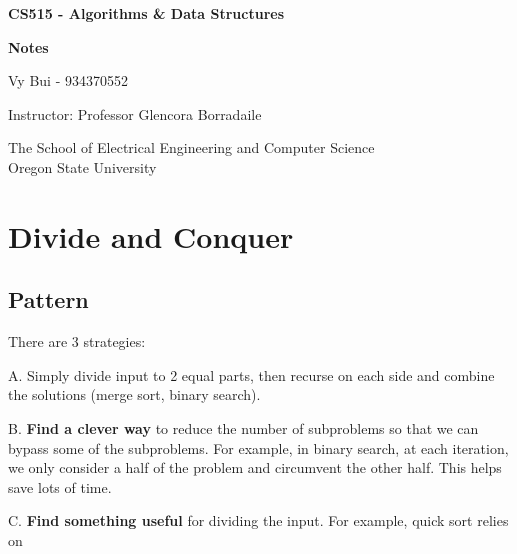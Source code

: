 \documentclass[12pt,article]{article}
\begin{document}
\begin{titlepage}
    \begin{center}
        \vspace*{4cm}

        \textbf{\Large CS515 - Algorithms \& Data Structures}

        \vspace{0.5cm}
 
        \textbf{\Large Notes}
 
        \vspace{1cm}

        Vy Bui - 934370552

        \vspace{2cm}

        Instructor: Professor Glencora Borradaile
        \vfill
             
        \vspace{0.8cm}
      
             
        The School of Electrical Engineering and Computer Science\\
        Oregon State University\\
             
    \end{center}
\end{titlepage}


\section{Divide and Conquer}
\subsection{Pattern}

There are 3 strategies:

A. Simply divide input to 2 equal parts, then recurse on each side and combine the solutions (merge sort, binary search).

B. \textbf{Find a clever way} to reduce the number of subproblems so that we can bypass some of the subproblems. For example, in binary search, at each iteration, we only consider a half of the problem and circumvent the other half. This helps save lots of time.

C. \textbf{Find something useful} for dividing the input. For example, quick sort relies on 

\end{document}

